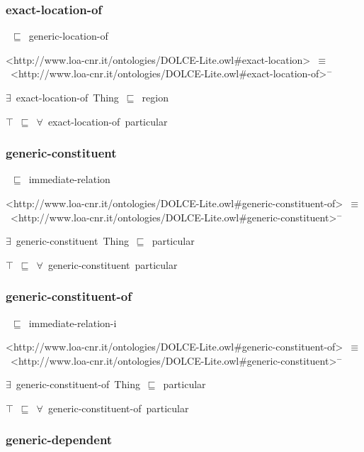 \documentclass{article}
\begin{document}
\subsubsection*{exact-location-of}

~\ensuremath{\sqsubseteq}~generic-location-of

<http://www.loa-cnr.it/ontologies/DOLCE-Lite.owl#exact-location>~\ensuremath{\equiv}~<http://www.loa-cnr.it/ontologies/DOLCE-Lite.owl#exact-location-of>\ensuremath{^-}

\ensuremath{\exists}~exact-location-of~Thing~\ensuremath{\sqsubseteq}~region

\ensuremath{\top}~\ensuremath{\sqsubseteq}~\ensuremath{\forall}~exact-location-of~particular

\subsubsection*{generic-constituent}

~\ensuremath{\sqsubseteq}~immediate-relation

<http://www.loa-cnr.it/ontologies/DOLCE-Lite.owl#generic-constituent-of>~\ensuremath{\equiv}~<http://www.loa-cnr.it/ontologies/DOLCE-Lite.owl#generic-constituent>\ensuremath{^-}

\ensuremath{\exists}~generic-constituent~Thing~\ensuremath{\sqsubseteq}~particular

\ensuremath{\top}~\ensuremath{\sqsubseteq}~\ensuremath{\forall}~generic-constituent~particular

\subsubsection*{generic-constituent-of}

~\ensuremath{\sqsubseteq}~immediate-relation-i

<http://www.loa-cnr.it/ontologies/DOLCE-Lite.owl#generic-constituent-of>~\ensuremath{\equiv}~<http://www.loa-cnr.it/ontologies/DOLCE-Lite.owl#generic-constituent>\ensuremath{^-}

\ensuremath{\exists}~generic-constituent-of~Thing~\ensuremath{\sqsubseteq}~particular

\ensuremath{\top}~\ensuremath{\sqsubseteq}~\ensuremath{\forall}~generic-constituent-of~particular

\subsubsection*{generic-dependent}
\end{document}
